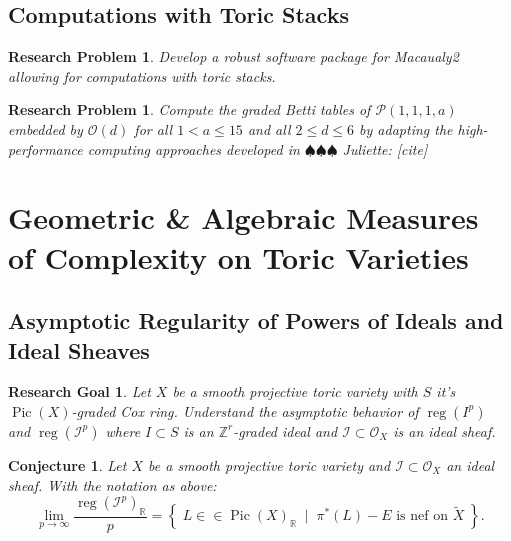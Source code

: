 \documentclass[11pt,reqno]{amsart}
\newtheorem{goal}[lemma]{Research Goal}
\newtheorem{problem}[lemma]{Research Problem}
\newtheorem{conjecture}[lemma]{Conjecture}
\theoremstyle{remark}
\newcommand{\reg}{\operatorname{reg}}
\newcommand{\Pic}{\operatorname{Pic}}
\newcommand{\RR}{\mathbb{R}}
\newcommand{\ZZ}{\mathbb{Z}}
\newcommand{\cI}{\mathcal{I}}
\newcommand{\cO}{\mathcal{O}}
\newcommand{\cP}{\mathcal{P}}
\newcommand{\juliette}[1]{{\color{red} \sf $\spadesuit\spadesuit\spadesuit$ Juliette: [#1]}}
\begin{document}
\subsection{Computations with Toric Stacks}

\begin{problem}\label{prob:toric-stacks-m2}
Develop a robust software package for \textit{Macaualy2} allowing for computations with toric stacks. 
\end{problem}

\begin{problem}
	Compute the graded Betti tables of $\cP(1,1,1,a)$ embedded by $\cO(d)$ for all $1<a \leq 15$ and all $2\leq d \leq 6$ by adapting the high-performance computing approaches developed in \juliette{cite}
\end{problem}
	
\section{Geometric \& Algebraic Measures of Complexity on Toric Varieties}

 \subsection{Asymptotic Regularity of Powers of Ideals and Ideal Sheaves}
 
 \begin{goal}
 	Let $X$ be a smooth projective toric variety with $S$ it's $\Pic(X)$-graded Cox ring. Understand the asymptotic behavior of $\reg(I^p)$ and $\reg(\cI^p)$ where $I \subset S$ is an $\ZZ^r$-graded ideal and $\cI\subset \cO_{X}$ is an ideal sheaf.
\end{goal}
 
 \begin{conjecture}\label{conj:reg-ideal-sheaves}
 	Let $X$ be a smooth projective toric variety and $\cI \subset \cO_{X}$ an ideal sheaf. With the notation as above:
	\[
	\lim_{p\to \infty} \frac{\reg\left(\cI^p\right)_{\RR}}{p} = \left\{ \; L \in\in \Pic(X)_{\RR} \;\; \big| \;\; \pi^*(L)-E \text{ is nef on $\tilde{X}$} \;\right\}.
	\]
 \end{conjecture}
 
\end{document}
